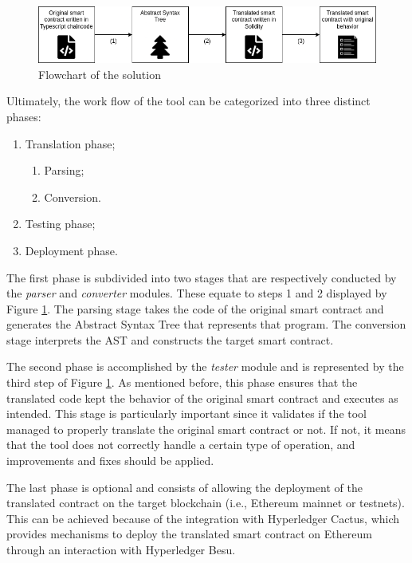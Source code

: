 \documentclass[runningheads]{llncs}
\begin{document}
\begin{figure}
  \vspace{-2mm}
  \includegraphics[width=\linewidth]{flow.png}
  \centering
  \caption{Flowchart of the solution}
  \label{fig:flow}
  \vspace{-2mm}
\end{figure}

Ultimately, the work flow of the tool can be categorized into three distinct phases: 
\begin{enumerate}
    \item Translation phase;
    \begin{enumerate}
        \item Parsing;
        \item Conversion.
    \end{enumerate}
    \item Testing phase;
    \item Deployment phase.
\end{enumerate}

The first phase is subdivided into two stages that are respectively conducted by the \textit{parser} and \textit{converter} modules. These equate to steps 1 and 2 displayed by Figure \ref{fig:flow}. The parsing stage takes the code of the original smart contract and generates the Abstract Syntax Tree that represents that program. The conversion stage interprets the AST and constructs the target smart contract.

The second phase is accomplished by the \textit{tester} module and is represented by the third step of Figure \ref{fig:flow}. As mentioned before, this phase ensures that the translated code kept the behavior of the original smart contract and executes as intended. This stage is particularly important since it validates if the tool managed to properly translate the original smart contract or not. If not, it means that the tool does not correctly handle a certain type of operation, and improvements and fixes should be applied.

The last phase is optional and consists of allowing the deployment of the translated contract on the target blockchain (i.e., Ethereum mainnet or testnets). This can be achieved because of the integration with Hyperledger Cactus, which provides mechanisms to deploy the translated smart contract on Ethereum through an interaction with Hyperledger Besu. 
\end{document}
